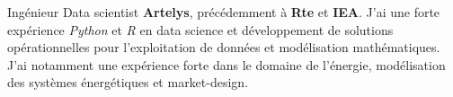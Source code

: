 
\begin{cvparagraph}

Ingénieur Data scientist \textbf{Artelys}, précédemment à \textbf{Rte} et \textbf{IEA}. J'ai une forte expérience \textit{Python} et \textit{R} en data science et développement de solutions opérationnelles pour l'exploitation de données et modélisation mathématiques. J'ai notamment une expérience forte dans le domaine de l'énergie, modélisation des systèmes énergétiques et market-design.

\end{cvparagraph}